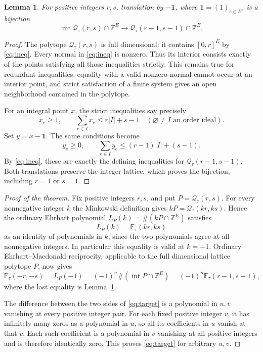 \documentclass[11pt]{article}
\newtheorem{lemma}{Lemma}
\newcommand{\E}{\mathbb E}
\newcommand{\Q}{\mathcal Q}
\newcommand{\Z}{\mathbb Z}
\begin{document}
\begin{lemma}\label{lem:shift}
For positive integers $r,s$, translation by $-\mathbf1$, where
$\mathbf1=(1)_{e\in E}$, is a bijection
\[
 \operatorname{int}\Q_\tau(r,s)\cap\Z^E
 \longrightarrow \Q_\tau(r-1,s-1)\cap\Z^E.
\]
\end{lemma}
\begin{proof}
The polytope $\Q_\tau(r,s)$ is full dimensional: it contains
$[0,r]^E$ by \eqref{eq:ineq}. Every normal in \eqref{eq:ineq} is
nonzero. Thus its interior consists exactly of the points satisfying
all those inequalities strictly. This remains true for redundant
inequalities: equality with a valid nonzero normal cannot occur at
an interior point, and strict satisfaction of a finite system gives
an open neighborhood contained in the polytope.

For an integral point $x$, the strict inequalities say precisely
\[
 x_e\ge1,
 \qquad \sum_{e\in I}x_e\le r|I|+s-1
 \quad(\varnothing\ne I\text{ an order ideal}).
\]
Set $y=x-\mathbf1$. The same conditions become
\[
 y_e\ge0,
 \qquad \sum_{e\in I}y_e\le(r-1)|I|+(s-1).
\]
By \eqref{eq:ineq}, these are exactly the defining inequalities for
$\Q_\tau(r-1,s-1)$. Both translations preserve the integer lattice,
which proves the bijection, including $r=1$ or $s=1$.
\end{proof}

\begin{proof}[Proof of the theorem]
Fix positive integers $r,s$, and put $P=\Q_\tau(r,s)$.
For every nonnegative integer $k$ the Minkowski definition gives
$kP=\Q_\tau(kr,ks)$. Hence the ordinary Ehrhart polynomial
$L_P(k)=\#(kP\cap\Z^E)$ satisfies
\[
 L_P(k)=\E_\tau(kr,ks)
\]
as an identity of polynomials in $k$, since the two polynomials
agree at all nonnegative integers. In particular this equality is
valid at $k=-1$. Ordinary Ehrhart--Macdonald reciprocity, applicable
to the full dimensional lattice polytope $P$, now gives
\[
 \E_\tau(-r,-s)=L_P(-1)
 =(-1)^n\#(\operatorname{int}P\cap\Z^E)
 =(-1)^n\E_\tau(r-1,s-1),
\]
where the last equality is Lemma~\ref{lem:shift}.

The difference between the two sides of \eqref{eq:target} is a
polynomial in $u,v$ vanishing at every positive integer pair.
For each fixed positive integer $v$, it has infinitely many zeros
as a polynomial in $u$, so all its coefficients in $u$ vanish at
that $v$. Each such coefficient is a polynomial in $v$ vanishing
at all positive integers and is therefore identically zero.
This proves \eqref{eq:target} for arbitrary $u,v$.
\end{proof}
\end{document}
